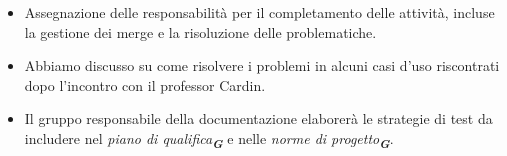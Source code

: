 \begin{itemize}
\begin{enumerate}
    \end{enumerate}
    \item Assegnazione delle responsabilità per il completamento delle attività, incluse la gestione dei merge e la risoluzione delle problematiche.
    \item Abbiamo discusso su come risolvere i problemi in alcuni casi d'uso riscontrati dopo l'incontro con il professor Cardin.
    \item Il gruppo responsabile della documentazione elaborerà le strategie di test da includere nel \emph{piano di qualifica}\textsubscript{\textit{\textbf{G}}} e nelle \emph{norme di progetto}\textsubscript{\textit{\textbf{G}}}.
\end{itemize}
